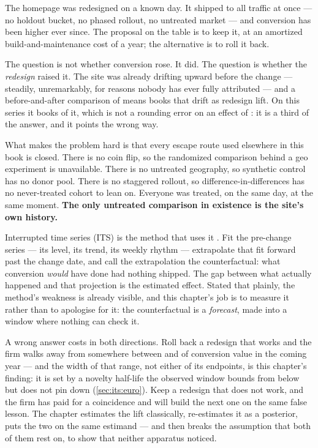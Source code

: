 The homepage was redesigned on a known day. It shipped to all traffic at once --- no holdout
bucket, no phased rollout, no untreated market --- and conversion has been higher ever since. The
proposal on the table is to keep it, at an amortized build-and-maintenance cost of
\eur{\nbTenCost} a year; the alternative is to roll it back.

The question is not whether conversion rose. It did. The question is whether the \emph{redesign}
raised it. The site was already drifting upward before the change --- steadily, unremarkably,
for reasons nobody has ever fully attributed --- and a before-and-after comparison of means books
that drift as redesign lift. On this series it books \pp{\nbTenNaiveTrendBias} of it, which is
not a rounding error on an effect of \pp{+\nbTenTrueLift}: it is a third of the answer, and it
points the wrong way.

What makes the problem hard is that every escape route used elsewhere in this book is closed.
There is no coin flip, so the randomized comparison behind a geo experiment is
unavailable. There is no untreated geography, so synthetic control has no donor
pool. There is no staggered rollout, so difference-in-differences has no never-treated cohort to
lean on. Everyone was treated, on the same day, at the same moment. \textbf{The only untreated
comparison in existence is the site's own history.}

Interrupted time series (ITS) is the method that uses it \citep{bernal2017}. Fit the pre-change
series --- its level, its trend, its weekly rhythm --- extrapolate that fit forward past the
change date, and call the extrapolation the counterfactual: what conversion \emph{would} have done
had nothing shipped. The gap between what actually happened and that projection is the estimated
effect. Stated that plainly, the method's weakness is already visible, and this chapter's job is
to measure it rather than to apologise for it: the counterfactual is a \emph{forecast}, made into
a window where nothing can check it.

A wrong answer costs in both directions. Roll back a redesign that works and the firm walks away
from somewhere between \eur{\nbTenPersValuethreem} and \eur{\nbTenPersValuenodecay} of conversion
value in the coming year --- and the width of that range, not either of its endpoints, is this
chapter's finding: it is set by a novelty half-life the observed window bounds from below but does
not pin down (\cref{sec:its:euro}). Keep a redesign that does not work, and the firm has
paid \eur{\nbTenCost} for a coincidence and will build the next one on the same false lesson. The
chapter estimates the lift classically, re-estimates it as a posterior, puts the two on the same
estimand --- and then breaks the assumption that both of them rest on, to show that neither
apparatus noticed.

